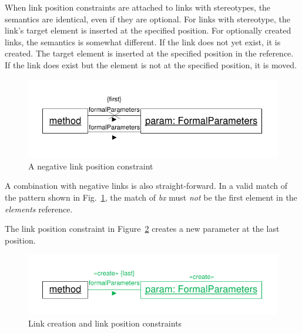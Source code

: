 {When link position constraints are attached to links with \destroy stereotypes, the semantics are identical, even if they are optional. For links with \create stereotype, the link's target element is inserted at the specified position. For optionally created links, the semantics is somewhat different. If the link does not yet exist, it is created. The target element is inserted at the specified position in the reference. If the link does exist but the element is not at the specified position, it is moved.


\begin{figure}[htbp]
\center
\includegraphics[width=0.75\columnwidth]{figures/LinkPositionConstraintNegated}
\caption{A negative link position constraint}
\label{fig:linkPositionConstraints:linkPositionConstraint2}
\end{figure}

A combination with negative links is also straight-forward. In a valid match of the pattern shown in Fig.~\ref{fig:linkPositionConstraints:linkPositionConstraint2}, the match of \emph{bx} must \emph{not} be the first element in the \emph{elements} reference.

The link position constraint in Figure~\ref{fig:linkPositionConstraints:linkPositionConstraint4} creates a new parameter at the last position.

\begin{figure}[htbp]
\center
\includegraphics[width=0.75\columnwidth]{figures/LinkPositionConstraintCreate}
\caption{Link creation and link position constraints}
\label{fig:linkPositionConstraints:linkPositionConstraint4}
\end{figure}

}
